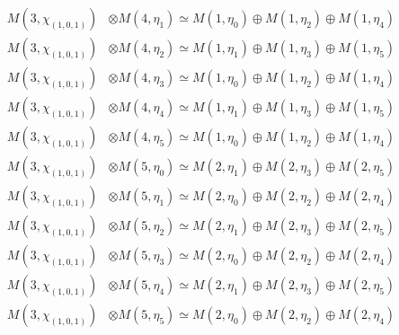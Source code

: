 \begin{align*}
M(3,\chi_{(1,0,1)}) &\otimes M(4,\eta_{1}) \simeq M(1,\eta_{0}) \oplus M(1,\eta_{2}) \oplus M(1,\eta_{4}) \\
M(3,\chi_{(1,0,1)}) &\otimes M(4,\eta_{2}) \simeq M(1,\eta_{1}) \oplus M(1,\eta_{3}) \oplus M(1,\eta_{5}) \\
M(3,\chi_{(1,0,1)}) &\otimes M(4,\eta_{3}) \simeq M(1,\eta_{0}) \oplus M(1,\eta_{2}) \oplus M(1,\eta_{4}) \\
M(3,\chi_{(1,0,1)}) &\otimes M(4,\eta_{4}) \simeq M(1,\eta_{1}) \oplus M(1,\eta_{3}) \oplus M(1,\eta_{5}) \\
M(3,\chi_{(1,0,1)}) &\otimes M(4,\eta_{5}) \simeq M(1,\eta_{0}) \oplus M(1,\eta_{2}) \oplus M(1,\eta_{4}) \\
M(3,\chi_{(1,0,1)}) &\otimes M(5,\eta_{0}) \simeq M(2,\eta_{1}) \oplus M(2,\eta_{3}) \oplus M(2,\eta_{5}) \\
M(3,\chi_{(1,0,1)}) &\otimes M(5,\eta_{1}) \simeq M(2,\eta_{0}) \oplus M(2,\eta_{2}) \oplus M(2,\eta_{4}) \\
M(3,\chi_{(1,0,1)}) &\otimes M(5,\eta_{2}) \simeq M(2,\eta_{1}) \oplus M(2,\eta_{3}) \oplus M(2,\eta_{5}) \\
M(3,\chi_{(1,0,1)}) &\otimes M(5,\eta_{3}) \simeq M(2,\eta_{0}) \oplus M(2,\eta_{2}) \oplus M(2,\eta_{4}) \\
M(3,\chi_{(1,0,1)}) &\otimes M(5,\eta_{4}) \simeq M(2,\eta_{1}) \oplus M(2,\eta_{3}) \oplus M(2,\eta_{5}) \\
M(3,\chi_{(1,0,1)}) &\otimes M(5,\eta_{5}) \simeq M(2,\eta_{0}) \oplus M(2,\eta_{2}) \oplus M(2,\eta_{4}) \\
\end{align*}

